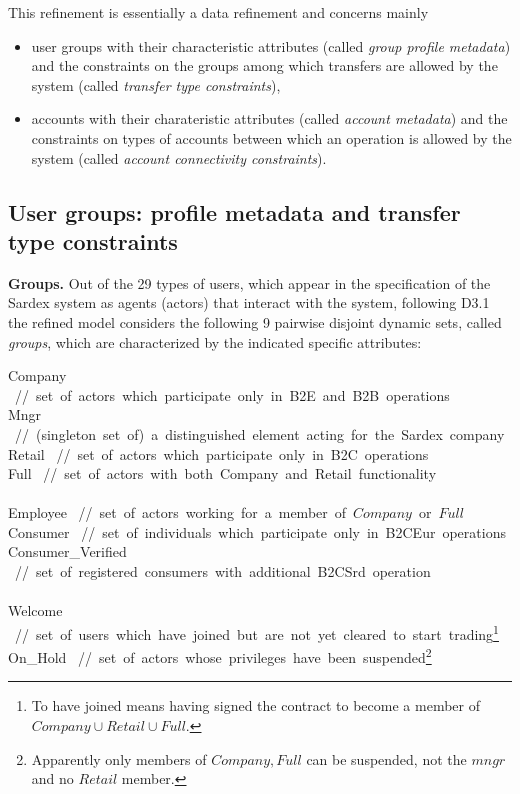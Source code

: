 This refinement is essentially a data refinement and concerns mainly 
\begin{itemize}
	\item user groups with their characteristic attributes (called \emph{group profile metadata}) and the constraints on the groups among which transfers are allowed by the system (called \emph{transfer type constraints}),
	
	\item accounts with their charateristic attributes (called \emph{account metadata}) and the constraints on types of accounts between which an operation is allowed by the system (called \emph{account connectivity constraints}).
\end{itemize}

\subsection{User groups: profile metadata and transfer type constraints}
\label{sect:usergroups} 

{\bf Groups.} Out of the 29 types of users, which appear in the specification of the Sardex system as agents (actors) that interact with the system, following D3.1 the refined model considers the following 9 pairwise disjoint dynamic sets, called \emph{groups}, which are characterized by the indicated specific attributes:

\begin{asm}
Company \mbox{  // set of actors which participate only in B2E and B2B operations}\\
Mngr 
  \mbox{  // (singleton set of) a distinguished element 
  	acting for the Sardex company}\\
Retail \mbox{  // set of actors which participate only in B2C operations}\\
Full \mbox{  // set of actors with both Company and Retail functionality}\\ 
\\
Employee \mbox{  // set of actors working for a member of $Company$ or $Full$}\\
Consumer \mbox{  // set of individuals which participate only in B2CEur operations} \\
Consumer\_Verified \mbox{  // set of registered consumers with additional B2CSrd operation} \\ 
\\
Welcome \mbox{  // set of users which have joined but are not yet cleared to start trading}\footnote{To have joined means having signed the contract to become a member of $Company \cup Retail \cup Full$.}\\
On\_Hold \mbox{  // set of actors whose privileges have been suspended}\footnote{Apparently only members of $Company, Full$ can be suspended, not the $mngr$
and no $Retail$ member.}
\end{asm}


